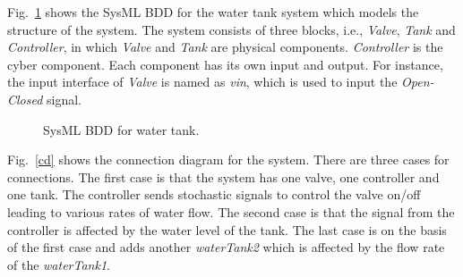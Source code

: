 Fig.~\ref{myad} shows the SysML BDD for the water tank system which models the structure of the system. The system consists of three blocks, i.e., \emph{Valve}, \emph{Tank} and \emph{Controller}, in which \emph{Valve} and \emph{Tank} are physical components. \emph{Controller} is the cyber component. Each component has its own input and output. For instance, the input interface of \emph{Valve} is named as \emph{vin}, which is used to input the \emph{Open-Closed} signal. 
\begin{figure}[htbp]
	\caption{SysML BDD for water tank.}
	\label{myad}
\end{figure}

Fig.~\ref{cd} shows the connection diagram for the system. There are three cases for connections. The first case is that the system has one valve, one controller and one tank. The controller sends stochastic signals to control the valve on/off leading to various rates of water flow. The second case is that the signal from the controller is affected by the water level of the tank. The last case is on the basis of the first case and adds another \emph{waterTank2} which is affected by the flow rate of the \emph{waterTank1}.

